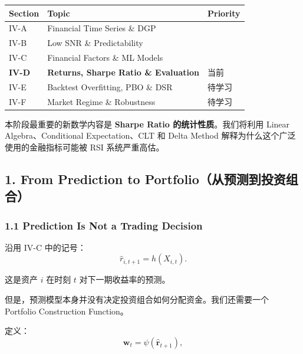 \begin{readertable}
\begin{longtable}[]{@{}
  >{\raggedright\arraybackslash}p{}
  >{\raggedright\arraybackslash}p{}
  >{\raggedright\arraybackslash}p{}@{}}
\toprule
Section & Topic & Priority \\
\midrule
\endhead
IV-A & Financial Time Series \& DGP & \\
IV-B & Low SNR \& Predictability & \\
IV-C & Financial Factors \& ML Models & \\
\textbf{IV-D} & \textbf{Returns, Sharpe Ratio \& Evaluation} & 当前 \\
IV-E & Backtest Overfitting, PBO \& DSR & 待学习 \\
IV-F & Market Regime \& Robustness & 待学习 \\
\bottomrule
\end{longtable}
\end{readertable}

本阶段最重要的新数学内容是 \textbf{Sharpe Ratio 的统计性质}。我们将利用 Linear Algebra、Conditional Expectation、CLT 和 Delta Method 解释为什么这个广泛使用的金融指标可能被 RSI 系统严重高估。

\hypertarget{part-4-67-0001-from-prediction-to-portfolioux4eceux9884ux6d4bux5230ux6295ux8d44ux7ec4ux5408}{%
\subsection{1. From Prediction to Portfolio（从预测到投资组合）}\label{part-4-67-0001-from-prediction-to-portfolioux4eceux9884ux6d4bux5230ux6295ux8d44ux7ec4ux5408}}

\hypertarget{part-4-67-0001-prediction-is-not-a-trading-decision}{%
\subsubsection{1.1 Prediction Is Not a Trading Decision}\label{part-4-67-0001-prediction-is-not-a-trading-decision}}

沿用 IV-C 中的记号：
\[\hat r_{i,t+1}=h(X_{i,t}).\]

这是资产 \(i\) 在时刻 \(t\) 对下一期收益率的预测。

但是，预测模型本身并没有决定投资组合如何分配资金。我们还需要一个 Portfolio Construction Function。

定义：
\[\boldsymbol w_t
=
\psi(\hat{\boldsymbol r}_{t+1}),\]

